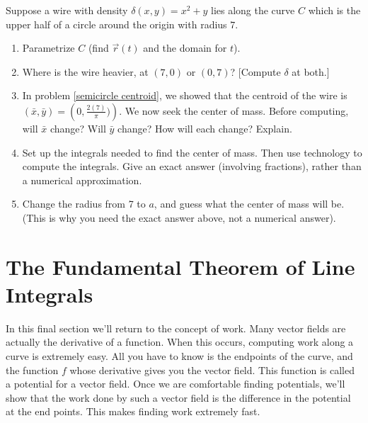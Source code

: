 \begin{problem}
%
Suppose a wire with density $\delta(x,y)=x^2+y$ lies along the curve $C$ which is the upper half of a circle around the origin with radius $7$.
\begin{enumerate}
\item Parametrize $C$ (find $\vec r(t)$ and the domain for $t$).
 \item Where is the wire heavier, at $(7,0)$ or $(0,7)$? [Compute $\delta$ at both.]
 \item In problem \ref{semicircle centroid}, we showed that the centroid of the wire is $(\bar x, \bar y) = \left(0,\frac{2(7)}{\pi})\right)$.  We now seek the center of mass. Before computing, will $\bar x$ change?  Will $\bar y$ change?  How will each change? Explain.
 \item Set up the integrals needed to find the center of mass. Then use technology to compute the integrals. Give an exact answer (involving fractions), rather than a numerical approximation.
 \item Change the radius from 7 to $a$, and guess what the center of mass will be.  (This is why you need the exact answer above, not a numerical answer).
\end{enumerate}
\end{problem}


















\section{The Fundamental Theorem of Line Integrals}

In this final section we'll return to the concept of work. Many vector fields are actually the derivative of a function.  When this occurs, computing work along a curve is extremely easy.  All you have to know is the endpoints of the curve, and the function $f$ whose derivative gives you the vector field. This function is called a potential for a vector field.  Once we are comfortable finding potentials, we'll show that the work done by such a vector field is the difference in the potential at the end points.  This makes finding work extremely fast.

